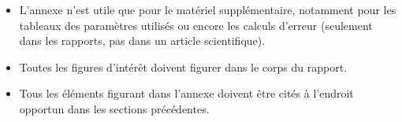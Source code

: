 \begin{itemize}
\item L'annexe n'est utile que pour le matériel supplémentaire, notamment pour les tableaux des paramètres utilisés ou encore les calculs d'erreur (seulement dans les rapports, pas dans un article scientifique).
\item Toutes les figures d'intérêt doivent figurer dans le corps du rapport.
\item Tous les éléments figurant dans l'annexe doivent être cités à l'endroit opportun dans les sections précédentes.
\end{itemize}

